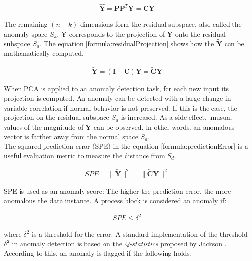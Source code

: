 \begin{gather}
     \mathbf{\hat{Y}} = \mathbf{P}\mathbf{P}^T\mathbf{Y} = \mathbf{CY}
    \label{formula:projection}
\end{gather}

The remaining $(n - k)$ dimensions form the residual subspace, also called the anomaly space $S_a$. $\mathbf{\widetilde{Y}}$ corresponds to the projection of $\mathbf{Y}$ onto the residual subspace $S_a$. The equation \ref{formula:residualProjection} shows how the $\mathbf{\widetilde{Y}}$ can be mathematically computed.  

\begin{gather}
     \mathbf{\widetilde{Y}} = (\mathbf{I - C})\mathbf{Y} = \mathbf{\widetilde{C}Y}
    \label{formula:residualProjection}
\end{gather}
 
When PCA is applied to an anomaly detection task, for each new input its projection is computed. An anomaly can be detected with a large change in variable correlation if normal behavior is not preserved. If this is the case, the projection on the residual subspace $S_a$ is increased. As a side effect, unusual values of the magnitude of $\mathbf{\widetilde{Y}}$ can be observed. In other words, an anomalous vector is farther away from the normal space $S_d$.\\

The squared prediction error (SPE) in the equation \ref{formula:predictionError} is a useful evaluation metric to measure the distance from $S_d$.
 
 \begin{gather}
     SPE = \parallel \mathbf{\widetilde{Y}} \parallel^2  = \parallel \mathbf{\widetilde{C}Y} \parallel^2
    \label{formula:predictionError}
\end{gather}

SPE is used as an anomaly score: The higher the prediction error, the more anomalous the data instance. A process block is considered an anomaly if:

\begin{gather}
     SPE \leq \delta^2
\end{gather}

where $\delta^2$ is a threshold for the error. A standard implementation of the threshold  $\delta^2$ in anomaly detection is based on the \textit{Q-statistics} proposed by Jackson \cite{pcaJackson1979}. According to this, an anomaly is flagged if the following holds:

